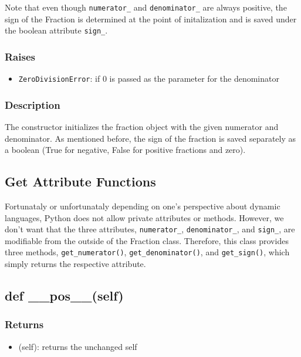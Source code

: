 \documentclass[refman]{scrartcl}
\begin{document}
Note that even though \texttt{numerator\_} and \texttt{denominator\_} are always positive, the sign of the Fraction is determined at the point of initalization and is saved under the boolean attribute \texttt{sign\_}.

\subsubsection*{Raises}

\begin{itemize}
  \item \texttt{ZeroDivisionError}: if \(0\) is passed as the parameter for the denominator
\end{itemize}

\subsubsection*{Description}

The constructor initializes the fraction object with the given numerator and denominator. As mentioned before, the sign of the fraction is saved separately as a boolean (True for negative, False for positive fractions and zero). 

\subsection{Get Attribute Functions}

Fortunataly or unfortunataly depending on one's perspective about dynamic languages, Python does not allow private attributes or methods. However, we don't want that the three attributes, \texttt{numerator\_}, \texttt{denominator\_}, and \texttt{sign\_}, are modifiable from the outside of the Fraction class. Therefore, this class provides three methods, \texttt{get\_numerator()}, \texttt{get\_denominator()}, and \texttt{get\_sign()}, which simply returns the respective attribute.

\subsection{def \_\_pos\_\_(self)}

\subsubsection*{Returns}

\begin{itemize}
  \item (self): returns the unchanged self
\end{itemize}
\end{document}
